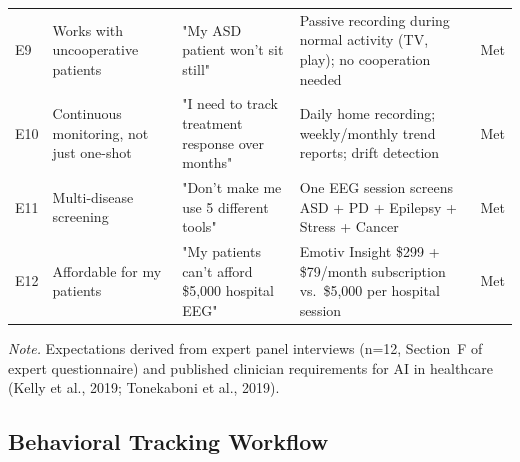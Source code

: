 {\begin{xltabular}{\textwidth}{@{} p{0.5cm} p{2.8cm} L L p{1.2cm} @{}}
\addlinespace
E9 & Works with uncooperative patients & "My ASD patient won't sit still" & Passive recording during normal activity (TV, play); no cooperation needed & Met \\
\addlinespace
E10 & Continuous monitoring, not just one-shot & "I need to track treatment response over months" & Daily home recording; weekly/monthly trend reports; drift detection & Met \\
\addlinespace
E11 & Multi-disease screening & "Don't make me use 5 different tools" & One EEG session screens ASD + PD + Epilepsy + Stress + Cancer & Met \\
\addlinespace
E12 & Affordable for my patients & "My patients can't afford \$5,000 hospital EEG" & Emotiv Insight \$299 + \$79/month subscription vs.\ \$5,000 per hospital session & Met \\
\end{xltabular}}
\vspace{0.5em}\noindent\textit{Note.} Expectations derived from expert panel interviews (n=12, Section~F of expert questionnaire) and published clinician requirements for AI in healthcare (Kelly et al., 2019; Tonekaboni et al., 2019).

\subsection{Behavioral Tracking Workflow}


